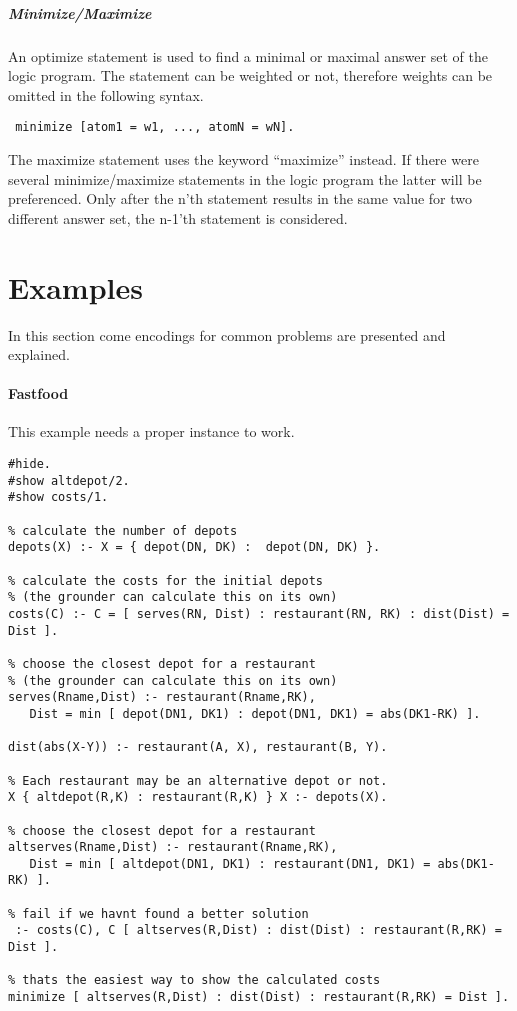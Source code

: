 \documentclass[a4paper,10pt]{article}
\begin{document}
\subparagraph{Minimize/Maximize}
An optimize statement is used to find a minimal or maximal answer set of the logic program.
The statement can be weighted or not, therefore weights can be omitted in the following syntax.
\begin{verbatim}
 minimize [atom1 = w1, ..., atomN = wN].
\end{verbatim}
The maximize statement uses the keyword ``maximize'' instead.
If there were several minimize/maximize statements in the logic program the latter will be preferenced.
Only after the n'th statement results in the same value for two different answer set, the n-1'th statement is considered.


\section{Examples}
In this section come encodings for common problems are presented and explained.
\paragraph{Fastfood}
This example needs a proper instance to work.
\begin{verbatim}
#hide.
#show altdepot/2.
#show costs/1.

% calculate the number of depots
depots(X) :- X = { depot(DN, DK) :  depot(DN, DK) }.

% calculate the costs for the initial depots
% (the grounder can calculate this on its own)
costs(C) :- C = [ serves(RN, Dist) : restaurant(RN, RK) : dist(Dist) = Dist ].

% choose the closest depot for a restaurant
% (the grounder can calculate this on its own)
serves(Rname,Dist) :- restaurant(Rname,RK),
   Dist = min [ depot(DN1, DK1) : depot(DN1, DK1) = abs(DK1-RK) ].

dist(abs(X-Y)) :- restaurant(A, X), restaurant(B, Y).

% Each restaurant may be an alternative depot or not.
X { altdepot(R,K) : restaurant(R,K) } X :- depots(X).

% choose the closest depot for a restaurant
altserves(Rname,Dist) :- restaurant(Rname,RK),
   Dist = min [ altdepot(DN1, DK1) : restaurant(DN1, DK1) = abs(DK1-RK) ].

% fail if we havnt found a better solution
 :- costs(C), C [ altserves(R,Dist) : dist(Dist) : restaurant(R,RK) = Dist ].

% thats the easiest way to show the calculated costs
minimize [ altserves(R,Dist) : dist(Dist) : restaurant(R,RK) = Dist ].
\end{verbatim}
\end{document}
